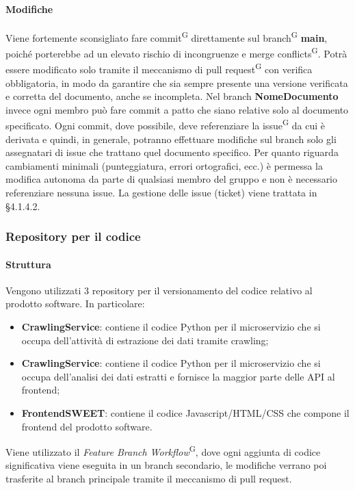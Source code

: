 \paragraph{Modifiche}
Viene fortemente sconsigliato fare commit\textsuperscript{G} direttamente sul branch\textsuperscript{G} \textbf{main}, poiché porterebbe ad un elevato rischio di incongruenze e merge conflicts\textsuperscript{G}. Potrà essere modificato solo tramite il meccanismo di pull request\textsuperscript{G} con verifica obbligatoria, in modo da garantire che sia sempre presente una versione verificata e corretta del documento, anche se incompleta.
Nel branch \textbf{NomeDocumento} invece ogni membro può fare commit a patto che siano relative solo al documento specificato. Ogni commit, dove possibile, deve referenziare la issue\textsuperscript{G} da cui è derivata e quindi, in generale, potranno effettuare modifiche sul branch solo gli assegnatari di issue che trattano quel documento specifico. Per quanto riguarda cambiamenti minimali (punteggiatura, errori ortografici, ecc.) è permessa la modifica autonoma da parte di qualsiasi membro del gruppo e non è necessario referenziare nessuna issue.
La gestione delle issue (ticket) viene trattata in §4.1.4.2.


\subsubsection{Repository per il codice}
\paragraph{Struttura}
Vengono utilizzati 3 repository per il versionamento del codice relativo al prodotto software. In particolare:
\begin{itemize}
	\item \textbf{CrawlingService}: contiene il codice Python per il microservizio che si occupa dell'attività di estrazione dei dati tramite crawling;
	\item \textbf{CrawlingService}: contiene il codice Python per il microservizio che si occupa dell'analisi dei dati estratti e fornisce la maggior parte delle API al frontend;
	\item \textbf{FrontendSWEET}: contiene il codice Javascript/HTML/CSS che compone il frontend del prodotto software.
\end{itemize}
Viene utilizzato il \textit{Feature Branch Workflow}\textsuperscript{G}, dove ogni aggiunta di codice significativa viene eseguita in un branch secondario, le modifiche verrano poi trasferite al branch principale tramite il meccanismo di pull request.

